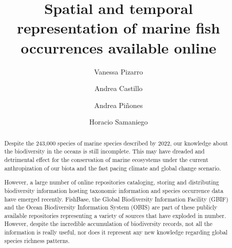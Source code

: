 \documentclass[12pt,authoryear]{elsarticle}
\providecommand{\DIFaddtex}[1]{{\protect\color{blue}\uwave{#1}}} %
\providecommand{\DIFaddbegin}{} %
\providecommand{\DIFaddend}{} %
\providecommand{\DIFdelbegin}{} %
\providecommand{\DIFdelend}{} %
\providecommand{\DIFadd}[1]{\texorpdfstring{\DIFaddtex{#1}}{#1}} %
\begin{document}
\begin{frontmatter}

  \title{
    Spatial and temporal representation of marine fish occurrences available online
  } 
  \author[ecoinfo]{Vanessa Pizarro}
  \author[ecoinfo,uach]{Andrea \DIFaddbegin \DIFadd{G. }\DIFaddend Castillo}
  \author[icml,FONDAP,COPAS,BASE]{Andrea Pi\~nones}
  \author[ecoinfo,iscv]{Horacio Samaniego}

  \DIFdelbegin %
\DIFdelend \DIFaddbegin \address[ecoinfo]{Laboratorio de Ecoinform\'atica, Instituto de Conservación, Biodiversidad y Territorio, Universidad Austral de Chile, Valdivia, Chile}
  \DIFaddend \address [uach] {Programa de Doctorado en Ciencias mención Ecología y Evolución, Escuela de Graduados, Facultad de Ciencias, Universidad Austral de Chile, Valdivia, Chile}
  \address[icml] {Instituto de Ciencias Marinas y Limnológicas, Facultad de Ciencias, Universidad Austral de Chile, Valdivia, Chile}
  \DIFdelbegin %
\DIFdelend \DIFaddbegin \address[FONDAP]{Centro FONDAP de Investigación en Dinámica de Ecosistemas Marinos de Altas Latitudes (IDEAL), Valdivia, Chile}
  \DIFaddend \address[COPAS]{Centro de Investigaci\'on Oceanogr\'afica COPAS-COASTAL, Universidad de Concepci\'on, Chile}
  \address[BASE]{Millenium Institute Biodiversity of Antarctic and Subantarctic Ecosystems - BASE, Chile}
  \address[iscv]{Instituto de Sistemas Complejos de Valpara\'iso, Subida Artiller\'ia 470, Valpara\'iso, Chile}



\linenumbers
\singlespacing

\begin{abstract} 

Despite the 243,000 species of  marine species described by 2022, our knowledge about the biodiversity in the oceans is still incomplete. This may have dreaded and detrimental effect for the conservation of marine ecosystems under the current anthropization of our biota and the fast pacing climate and global change scenario.

However, a large number of online repositories cataloging, storing and distributing biodiversity information hosting taxonomic information and species occurrence data have emerged recently. FishBase, the Global Biodiversity Information Facility (GBIF) and the Ocean Biodiversity Information System (OBIS) are part of these publicly available repositories  representing a variety of sources that have exploded in number. However, despite the incredible accumulation of biodiversity records, not all the information is really useful, nor does it represent any new knowledge regarding global species richness patterns.


\end{abstract}
\end{frontmatter}
\end{document}
